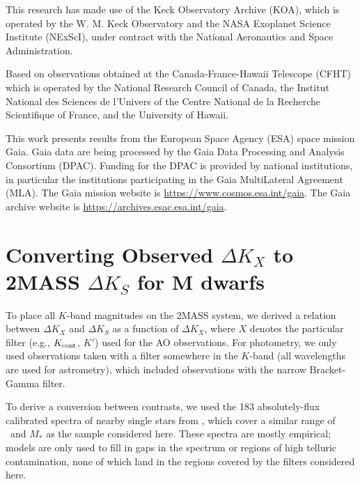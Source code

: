 \documentclass[twocolumn]{aastex62}
\begin{document}
 This research has made use of the Keck Observatory Archive (KOA), which is operated by the W. M. Keck Observatory and the NASA Exoplanet Science Institute (NExScI), under contract with the National Aeronautics and Space Administration. 

Based on observations obtained at the Canada-France-Hawaii Telescope (CFHT) which is operated by the National Research Council of Canada, the Institut National des Sciences de l'Univers of the Centre National de la Recherche Scientifique of France, and the University of Hawaii. 

This work presents results from the European Space Agency (ESA) space mission Gaia. Gaia data are being processed by the Gaia Data Processing and Analysis Consortium (DPAC). Funding for the DPAC is provided by national institutions, in particular the institutions participating in the Gaia MultiLateral Agreement (MLA). The Gaia mission website is \href{https://www.cosmos.esa.int/gaia}{https://www.cosmos.esa.int/gaia}. The Gaia archive website is \href{https://archives.esac.esa.int/gaia}{https://archives.esac.esa.int/gaia}.









\clearpage

\appendix 
\section{Converting Observed $\Delta K_X$ to 2MASS $\Delta K_S$ for M dwarfs} \label{sec:a1}
To place all $K$-band magnitudes on the 2MASS system, we derived a relation between $\Delta K_X$ and $\Delta K_S$ as a function of $\Delta K_X$, where $X$ denotes the particular filter (e.g., $K_{\rm{cont}}$, $K'$) used for the AO observations. For photometry, we only used observations taken with a filter somewhere in the $K$-band (all wavelengths are used for astrometry), which included observations with the narrow Bracket-Gamma filter. 

To derive a conversion between contrasts, we used the 183 absolutely-flux calibrated spectra of nearby single stars from \citet{Mann2015b}, which cover a similar range of \teff\ and $M_*$ as the sample considered here. These spectra are mostly empirical; models are only used to fill in gaps in the spectrum or regions of high telluric contamination, none of which land in the regions covered by the filters considered here.
\end{document}
